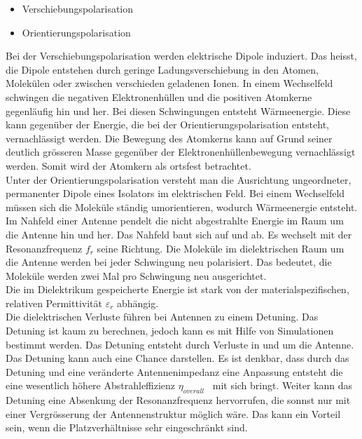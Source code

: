 \begin{itemize}
\item Verschiebungspolarisation
\item Orientierungspolarisation
\end{itemize}
Bei der Verschiebungspolarisation werden elektrische Dipole induziert. Das heisst, die Dipole entstehen durch geringe Ladungsverschiebung in den Atomen, Molekülen oder zwischen verschieden geladenen Ionen. In einem Wechselfeld schwingen die negativen Elektronenhüllen und die positiven Atomkerne gegenläufig hin und her. Bei diesen Schwingungen entsteht Wärmeenergie. Diese kann gegenüber der Energie, die bei der Orientierungspolarisation entsteht, vernachlässigt werden. Die Bewegung des Atomkerns kann auf Grund seiner deutlich grösseren Masse gegenüber der Elektronenhüllenbewegung vernachlässigt werden. Somit wird der Atomkern als ortsfest betrachtet. \\
Unter der Orientierungspolarisation versteht man die Ausrichtung ungeordneter, permanenter Dipole eines Isolators im elektrischen Feld. Bei einem Wechselfeld müssen sich die Moleküle ständig umorientieren, wodurch Wärmeenergie entsteht\cite{DielektrikumPolarisation}.\\
Im Nahfeld einer Antenne pendelt die nicht abgestrahlte Energie im Raum um die Antenne hin und her. Das Nahfeld baut sich auf und ab. Es wechselt mit der Resonanzfrequenz $f_{r}$ seine Richtung. Die Moleküle im dielektrischen Raum um die Antenne werden bei jeder Schwingung neu polarisiert. Das bedeutet, die Moleküle werden zwei Mal pro Schwingung neu ausgerichtet.\\
Die im Dielektrikum gespeicherte Energie ist stark von der materialspezifischen, relativen Permittivität $\varepsilon_r $ abhängig.\\
Die dielektrischen Verluste führen bei Antennen zu einem Detuning. Das Detuning ist kaum zu berechnen, jedoch kann es mit Hilfe von Simulationen bestimmt werden. Das Detuning entsteht durch Verluste in und um die Antenne.\\ 
Das Detuning kann auch eine Chance darstellen. Es ist denkbar, dass durch das Detuning und eine veränderte Antennenimpedanz eine Anpassung entsteht die eine wesentlich höhere Abstrahleffizienz $\eta_{overall}$ \ mit sich bringt. Weiter kann das Detuning eine Absenkung der Resonanzfrequenz hervorrufen, die sonnst nur mit einer Vergrösserung der Antennenstruktur möglich wäre. Das kann ein Vorteil sein, wenn die Platzverhältnisse sehr eingeschränkt sind.\\
